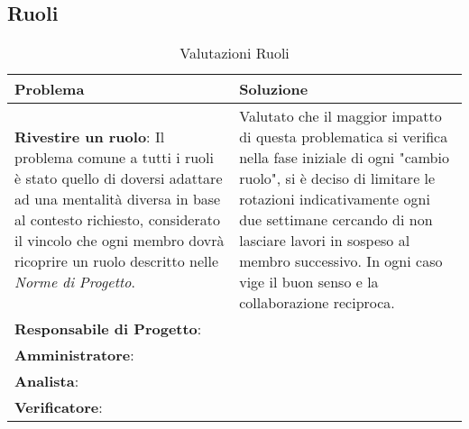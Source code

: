 \subsection{Ruoli}
	\begin{longtable}{ 
			>{\centering}p{} 
			>{\centering\arraybackslash}p{} }
		
		\caption {Valutazioni Ruoli}		\\
		
		\textbf{\color{white}Problema} &
		\textbf{\color{white}Soluzione}
		\tabularnewline  
		\endhead
		
		\textbf{Rivestire un ruolo}: Il problema comune a tutti i ruoli è stato quello di doversi adattare ad una mentalità diversa in base al contesto richiesto, considerato il vincolo che ogni membro dovrà ricoprire un ruolo descritto nelle \textit{Norme di Progetto}. & Valutato che il maggior impatto di questa problematica si verifica nella fase iniziale di ogni "cambio ruolo", si è deciso di limitare le rotazioni indicativamente ogni due settimane cercando di non lasciare lavori in sospeso al membro successivo. In ogni caso vige il buon senso e la collaborazione reciproca. \\
		
		\textbf{Responsabile di Progetto}: & \\
		
		\textbf{Amministratore}: & \\
		
		\textbf{Analista}: & \\
		
		\textbf{Verificatore}: & \\
		
	\end{longtable}


